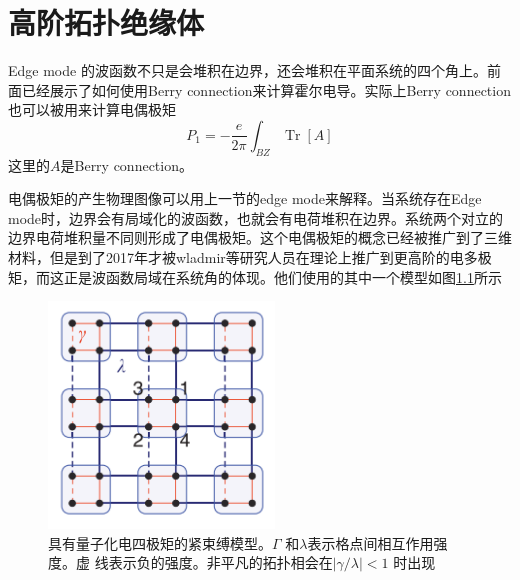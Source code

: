 \chapter{高阶拓扑绝缘体}
Edge mode 的波函数不只是会堆积在边界，还会堆积在平面系统的四个角上。前面已经展示了如何使用Berry connection来计算霍尔电导。实际上Berry connection也可以被用来计算电偶极矩
\begin{equation}
P_{1}=-\frac{e}{2 \pi} \int_{B Z} \operatorname{Tr}[A]
\end{equation}
这里的$A$是Berry connection。

电偶极矩的产生物理图像可以用上一节的edge mode来解释。当系统存在Edge mode时，边界会有局域化的波函数，也就会有电荷堆积在边界。系统两个对立的边界电荷堆积量不同则形成了电偶极矩。这个电偶极矩的概念已经被推广到了三维材料，但是到了2017年才被wladmir等研究人员在理论上推广到更高阶的电多极矩，而这正是波函数局域在系统角的体现\cite{hoti}。他们使用的其中一个模型如图\ref{hotimodel}所示
 \begin {figure}[tbp]
\centering 
\includegraphics[width=6cm]{./images/HOTIModel.png} 
\caption{具有量子化电四极矩的紧束缚模型。$\Gamma$ 和$\lambda$表示格点间相互作用强度。虚
线表示负的强度。非平凡的拓扑相会在$|\gamma / \lambda| < 1$ 时出现}
\label{hotimodel}
\end {figure} 


